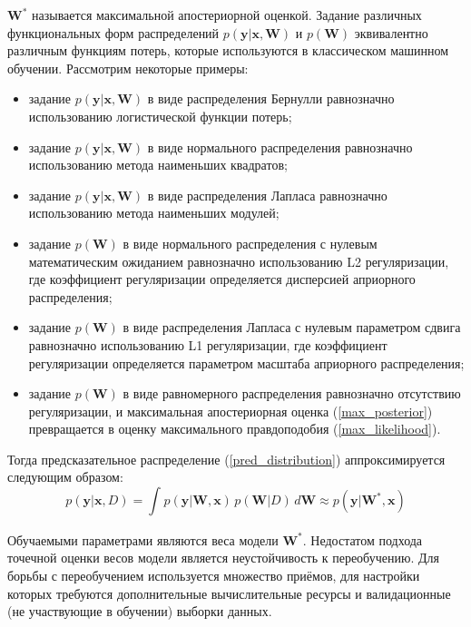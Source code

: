 \documentclass{article}
\numberwithin{equation}{section}
\begin{document}
    $\pmb{W}^*$ называется максимальной апостериорной оценкой.
    Задание различных функциональных форм распределений
    $p(\pmb{y} | \pmb{x}, \pmb{W})$ и $p(\pmb{W})$
    эквивалентно различным функциям потерь, которые используются
    в классическом машинном обучении.
    Рассмотрим некоторые примеры:
    \begin{itemize}
        \item задание $p(\pmb{y} | \pmb{x}, \pmb{W})$ в виде распределения Бернулли
            равнозначно использованию логистической функции потерь;
        \item задание $p(\pmb{y} | \pmb{x}, \pmb{W})$ в виде нормального распределения
            равнозначно использованию метода наименьших квадратов;
        \item задание $p(\pmb{y} | \pmb{x}, \pmb{W})$ в виде распределения Лапласа
            равнозначно использованию метода наименьших модулей;
        \item задание $p(\pmb{W})$ в виде нормального распределения с нулевым математическим ожиданием
            равнозначно использованию L2 регуляризации,
            где коэффициент регуляризации определяется дисперсией априорного распределения;
        \item задание $p(\pmb{W})$ в виде распределения Лапласа с нулевым параметром сдвига
            равнозначно использованию L1 регуляризации,
            где коэффициент регуляризации определяется параметром масштаба априорного распределения;
        \item задание $p(\pmb{W})$ в виде равномерного распределения
            равнозначно отсутствию регуляризации,
            и максимальная апостериорная оценка (\ref{max_posterior}) превращается в
            оценку максимального правдоподобия (\ref{max_likelihood}).
    \end{itemize}

    Тогда предсказательное распределение (\ref{pred_distribution})
    аппроксимируется следующим образом:
    \begin{equation}
        p(\pmb{y} | \pmb{x}, D)
        =
        \int_{}{
            p(\pmb{y} | \pmb{W}, \pmb{x})
            \,
            p(\pmb{W} | D)
            \,
            d\pmb{W}
        }
        \approx
        p(\pmb{y} | \pmb{W}^*, \pmb{x})
    \end{equation}

    Обучаемыми параметрами являются веса модели $\pmb{W}^*$.
    Недостатом подхода точечной оценки весов модели является неустойчивость к переобучению.
    Для борьбы с переобучением используется множество приёмов,
    для настройки которых требуются дополнительные вычислительные ресурсы
    и валидационные (не участвующие в обучении) выборки данных.
\end{document}
